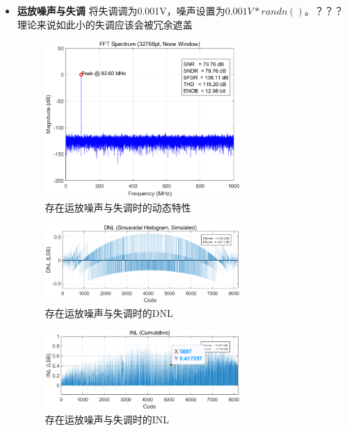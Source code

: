 \documentclass[cs4size,a4paper]{ctexart}
\numberwithin{equation}{section}
\numberwithin{table}{section}
\numberwithin{figure}{section}
\begin{document}
\begin{itemize}
		\item \textbf{运放噪声与失调} 将失调调为0.001V，噪声设置为$0.001V*randn()$。？？？理论来说如此小的失调应该会被冗余遮盖
		\begin{figure}[H]
			\centering
			\includegraphics[width=0.7\textwidth]{pic/Avno/DFT.png}
			\caption{存在运放噪声与失调时的动态特性} 
		\end{figure}

		\begin{figure}[H]
			\centering
			\includegraphics[width=0.7\textwidth]{pic/Avno/DNL.png}
			\caption{存在运放噪声与失调时的DNL} 
		\end{figure}

		\begin{figure}[H]
			\centering
			\includegraphics[width=0.7\textwidth]{pic/Avno/INL.png}
			\caption{存在运放噪声与失调时的INL} 
		\end{figure}

	\end{itemize}
\end{document}

